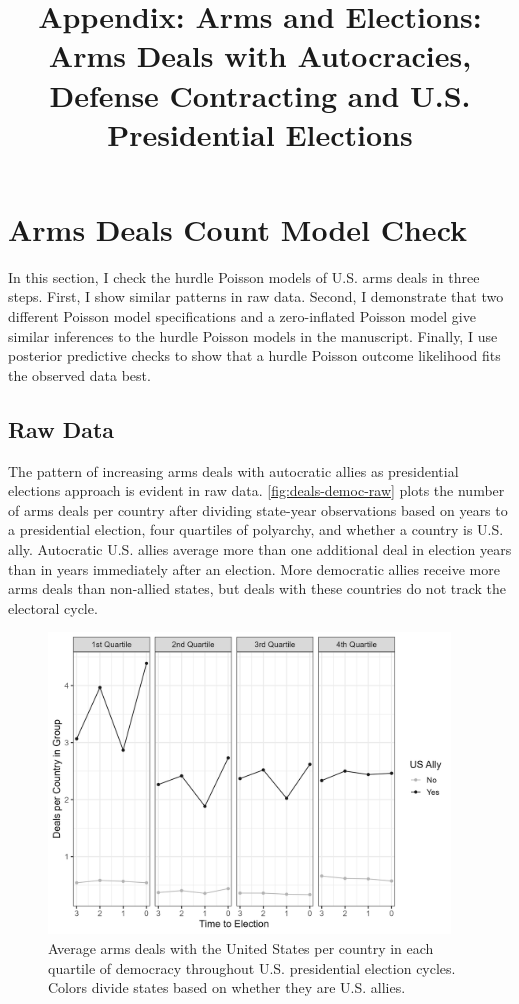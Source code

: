\documentclass[12pt]{article}
\title{\textbf{Appendix: Arms and Elections: Arms Deals with Autocracies, Defense Contracting and U.S. Presidential Elections}}
\date{}
\begin{document}
\maketitle 

\singlespace 

\tableofcontents

\bigskip





\section{Arms Deals Count Model Check}

In this section, I check the hurdle Poisson models of U.S. arms deals in three steps. 
First, I show similar patterns in raw data. 
Second, I demonstrate that two different Poisson model specifications and a zero-inflated Poisson model give similar inferences to the hurdle Poisson models in the manuscript. 
Finally, I use posterior predictive checks to show that a hurdle Poisson outcome likelihood fits the observed data best. 


\subsection{Raw Data}

The pattern of increasing arms deals with autocratic allies as presidential elections approach is evident in raw data.
\autoref{fig:deals-democ-raw} plots the number of arms deals per country after dividing state-year observations based on years to a presidential election, four quartiles of polyarchy, and whether a country is U.S. ally.
Autocratic U.S. allies average more than one additional deal in election years than in years immediately after an election. 
More democratic allies receive more arms deals than non-allied states, but deals with these countries do not track the electoral cycle. 


\begin{figure}[htpb]
	\centering
		\includegraphics[width=0.95\textwidth]{deals-democ-raw.png}
	\caption{Average arms deals with the United States per country in each quartile of democracy throughout U.S. presidential election cycles. Colors divide states based on whether they are U.S. allies.}
	\label{fig:deals-democ-raw}
\end{figure}
\end{document}
